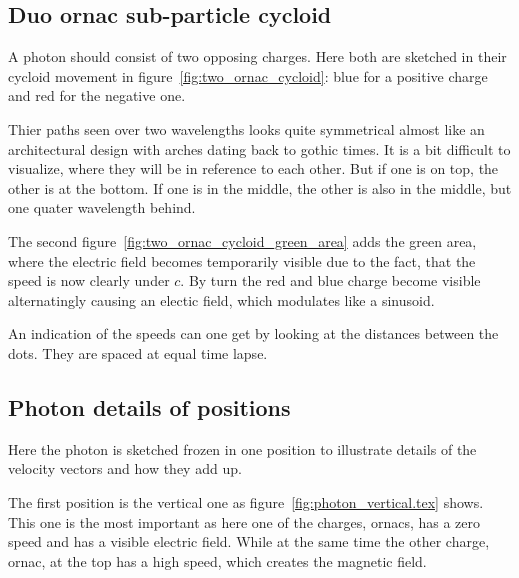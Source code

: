 \subsection{Duo ornac sub-particle cycloid}


A photon should consist of two opposing charges. Here both are sketched in their cycloid movement in figure~\vref{fig:two_ornac_cycloid}: blue for a positive charge and red for the negative one.

Thier paths seen over two wavelengths looks quite symmetrical almost like an architectural design with arches dating back to gothic times. It is a bit difficult to visualize, where they will be in reference to each other. But if one is on top, the other is at the bottom. If one is in the middle, the other is also in the middle, but one quater wavelength behind.

The second figure~\vref{fig:two_ornac_cycloid_green_area} adds the green area, where the electric field becomes temporarily visible due to the fact, that the speed is now clearly under $c$. By turn the red and blue charge become visible alternatingly causing an electic field, which modulates like a sinusoid.

An indication of the speeds can one get by looking at the distances between the dots. They are spaced at equal time lapse.







\subsection{Photon details of positions}
Here the photon is sketched frozen in one position to illustrate details of the velocity vectors and how they add up.

The first position is the vertical one as figure~\vref{fig:photon_vertical.tex} shows. This one is the most important as here one of the charges, ornacs, has a zero speed and has a visible electric field. While at the same time the other charge, ornac, at the top has a high speed, which creates the magnetic field.









